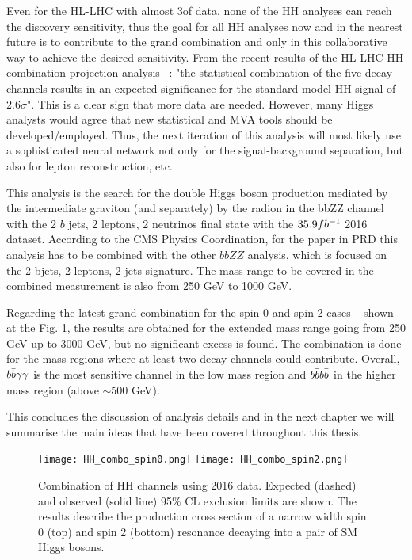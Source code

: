    
Even for the HL-LHC with almost 3\abinv of data, none of the HH analyses can reach the discovery sensitivity, thus the goal for all HH analyses now and in the nearest future is to contribute to the grand combination and only in this collaborative way to achieve the desired sensitivity. From the recent results of the HL-LHC HH combination projection analysis ~\cite{CMS-PAS-FTR-18-019}: "the statistical combination of the five decay channels results in an expected significance for the standard model HH signal of 2.6$\sigma$". This is a clear sign that more data are needed. However, many Higgs analysts would agree that new statistical and MVA tools should be developed/employed. Thus, the next iteration of this analysis will most likely use a sophisticated neural network not only for the signal-background separation, but also for lepton reconstruction, etc. 

This analysis is the search for the double Higgs boson production mediated by the intermediate graviton (and separately) by the radion in the bbZZ channel with the 2 $b$ jets, 2 leptons, 2 neutrinos final state with the $35.9fb^{-1}$ 2016 dataset. According to the CMS Physics Coordination, for the paper in PRD this analysis has to be combined with the other $bbZZ$ analysis, which is focused on the 2 bjets, 2 leptons, 2 jets signature. %
The mass range to be covered in the combined measurement is also from 250 GeV to 1000 GeV.

Regarding the latest grand combination for the spin 0 and spin 2 cases ~\cite{CMS-PAS-HIG-17-030} shown at the Fig. \ref{HH_combo}, the results are obtained for the extended mass range going from 250 GeV up to 3000 GeV, but no significant excess is found. The combination is done for the mass regions where at least two decay channels could contribute. Overall, $b\bar{b} \gamma\gamma$ is the most sensitive channel in the low mass region and $b\bar{b} b\bar{b}$ in the higher mass region (above $\sim$500 GeV).

This concludes the discussion of analysis details and in the next chapter we will summarise the main ideas that have been covered throughout this thesis. 


\begin{figure}[H]%
  \begin{center}
    \texttt{[image: HH\_combo\_spin0.png]}
    \texttt{[image: HH\_combo\_spin2.png]}
    \caption{ Combination of HH channels using 2016 data. Expected (dashed) and observed (solid line) 95\% CL exclusion limits are shown. The results describe the production cross section of a narrow width spin 0 (top) and spin 2 (bottom) resonance decaying into a pair of SM Higgs bosons.  }
    \label{HH_combo}
  \end{center}
\end{figure}






